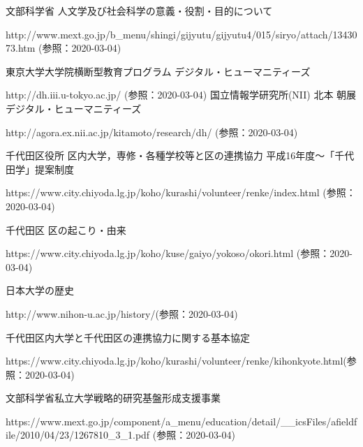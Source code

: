 \documentclass[a4paper, twoside]{jarticle}
\begin{document}
\begin{thebibliography}{99}

文部科学省 人文学及び社会科学の意義・役割・目的について\par
http://www.mext.go.jp/b\_menu/shingi/gijyutu/gijyutu4/015/siryo/attach/1343073.htm (参照：2020-03-04)

東京大学大学院横断型教育プログラム デジタル・ヒューマニティーズ\par
http://dh.iii.u-tokyo.ac.jp/ (参照：2020-03-04)
国立情報学研究所(NII) 北本 朝展 デジタル・ヒューマニティーズ\par
http://agora.ex.nii.ac.jp/kitamoto/research/dh/ (参照：2020-03-04)



千代田区役所 区内大学，専修・各種学校等と区の連携協力 平成16年度〜「千代田学」提案制度\par
https://www.city.chiyoda.lg.jp/koho/kurashi/volunteer/renke/index.html (参照：2020-03-04)


千代田区 区の起こり・由来\par
https://www.city.chiyoda.lg.jp/koho/kuse/gaiyo/yokoso/okori.html (参照：2020-03-04)

日本大学の歴史\par
http://www.nihon-u.ac.jp/history/(参照：2020-03-04)

千代田区内大学と千代田区の連携協力に関する基本協定\par
https://www.city.chiyoda.lg.jp/koho/kurashi/volunteer/renke/kihonkyote.html(参照：2020-03-04)

文部科学省私立大学戦略的研究基盤形成支援事業\par
https://www.mext.go.jp/component/a\_menu/education/detail/\_\_icsFiles/afieldfile/2010/04/23/1267810\_3\_1.pdf (参照：2020-03-04)


\end{thebibliography}
\end{document}

